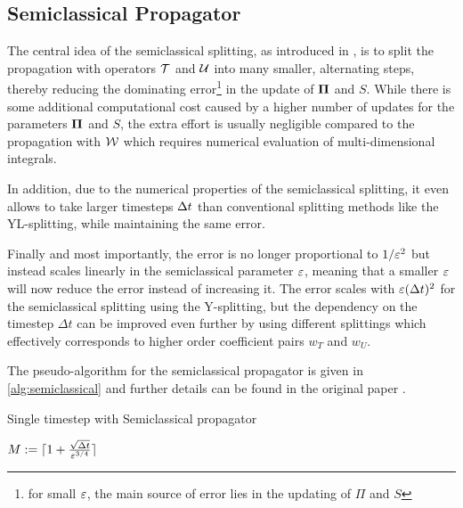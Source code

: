 \subsection{Semiclassical Propagator}
\label{sub:semiclassical_propagator}
%
The central idea of the semiclassical splitting, as introduced in \cite{GH_convsemiclassical},
is to split the propagation with operators $\mathcal{T}$ and $\mathcal{U}$ into many smaller, alternating steps, thereby reducing the dominating error\footnote{for small $\varepsilon$,
the main source of error lies in the updating of $\Pi$ and $S$} in the update of $\bm{\Pi}$ and $S$.
While there is some additional computational cost caused by a higher number of updates for the parameters $\bm{\Pi}$ and $S$, the extra effort is usually negligible compared to the propagation with $\mathcal{W}$ which requires numerical evaluation of multi-dimensional integrals. 
\par\medskip
%
In addition, due to the numerical properties of the semiclassical splitting, 
it even allows to take larger timesteps $\Delta t$ than conventional
splitting methods like the YL-splitting, while maintaining the same error.
\par\medskip
%
Finally and most importantly, the error is no longer proportional to $1/\varepsilon^2$ but instead
scales linearly in the semiclassical parameter $\varepsilon$,
meaning that a smaller $\varepsilon$ will now reduce the error instead of increasing it.
The error scales with $\varepsilon (\Delta t)^2$ for the semiclassical splitting using the Y-splitting,
but the dependency on the timestep $\Delta t$ can be improved even further by using different
splittings which effectively corresponds to higher order coefficient pairs $w_T$ and $w_U$.
\par\medskip
%
The pseudo-algorithm for the semiclassical propagator is given in \ref{alg:semiclassical} and 
further details can be found in the original paper \cite{GH_convsemiclassical}.
%
\begin{algorithm}[h]
	\caption{Single timestep with Semiclassical propagator}
	\label{alg:semiclassical}
	\begin{algorithmic}
		\State
		\State $M := \lceil 1 + \frac{\sqrt{\Delta t}}{\varepsilon^{3/4}} \rceil$
		\State
		\State {}
		\State {}
		\State {}
		\State
	\EndProcedure
	\end{algorithmic}
\end{algorithm}


